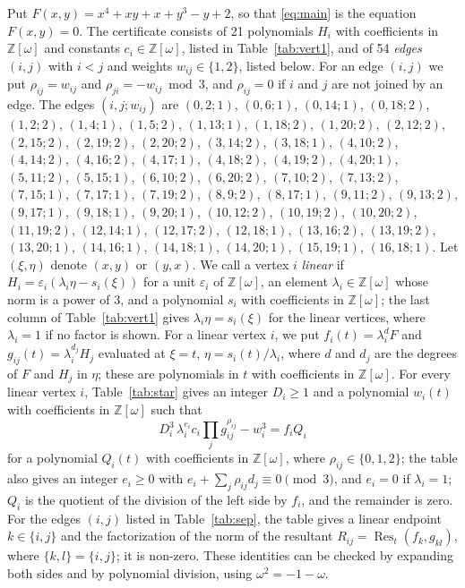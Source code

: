 \documentclass[11pt]{article}
\newcommand{\Z}{\mathbb{Z}}
\begin{document}
Put $F(x,y)=x^{4}+xy+x+y^{3}-y+2$, so that \eqref{eq:main} is the equation $F(x,y)=0$. The certificate consists of 21 polynomials $H_i$ with coefficients in $\Z[\omega]$ and constants $c_i\in\Z[\omega]$, listed in Table~\ref{tab:vert1}, and of 54 \emph{edges} $(i,j)$ with $i<j$ and weights $w_{ij}\in\{1,2\}$, listed below. For an edge $(i,j)$ we put $\rho_{ij}=w_{ij}$ and $\rho_{ji}=-w_{ij}\bmod 3$, and $\rho_{ij}=0$ if $i$ and $j$ are not joined by an edge.
The edges $(i,j;w_{ij})$ are $(0,2;1)$, $(0,6;1)$, $(0,14;1)$, $(0,18;2)$, $(1,2;2)$, $(1,4;1)$, $(1,5;2)$, $(1,13;1)$, $(1,18;2)$, $(1,20;2)$, $(2,12;2)$, $(2,15;2)$, $(2,19;2)$, $(2,20;2)$, $(3,14;2)$, $(3,18;1)$, $(4,10;2)$, $(4,14;2)$, $(4,16;2)$, $(4,17;1)$, $(4,18;2)$, $(4,19;2)$, $(4,20;1)$, $(5,11;2)$, $(5,15;1)$, $(6,10;2)$, $(6,20;2)$, $(7,10;2)$, $(7,13;2)$, $(7,15;1)$, $(7,17;1)$, $(7,19;2)$, $(8,9;2)$, $(8,17;1)$, $(9,11;2)$, $(9,13;2)$, $(9,17;1)$, $(9,18;1)$, $(9,20;1)$, $(10,12;2)$, $(10,19;2)$, $(10,20;2)$, $(11,19;2)$, $(12,14;1)$, $(12,17;2)$, $(12,18;1)$, $(13,16;2)$, $(13,19;2)$, $(13,20;1)$, $(14,16;1)$, $(14,18;1)$, $(14,20;1)$, $(15,19;1)$, $(16,18;1)$.
Let $(\xi,\eta)$ denote $(x,y)$ or $(y,x)$. We call a vertex $i$ \emph{linear} if $H_i=\varepsilon_i(\lambda_i\eta-s_i(\xi))$ for a unit $\varepsilon_i$ of $\Z[\omega]$, an element $\lambda_i\in\Z[\omega]$ whose norm is a power of $3$, and a polynomial $s_i$ with coefficients in $\Z[\omega]$; the last column of Table~\ref{tab:vert1} gives $\lambda_i\eta=s_i(\xi)$ for the linear vertices, where $\lambda_i=1$ if no factor is shown. For a linear vertex $i$, we put $f_i(t)=\lambda_i^{d}F$ and $g_{ij}(t)=\lambda_i^{d_j}H_j$ evaluated at $\xi=t$, $\eta=s_i(t)/\lambda_i$, where $d$ and $d_j$ are the degrees of $F$ and $H_j$ in $\eta$; these are polynomials in $t$ with coefficients in $\Z[\omega]$.
For every linear vertex $i$, Table~\ref{tab:star} gives an integer $D_i\geq1$ and a polynomial $w_i(t)$ with coefficients in $\Z[\omega]$ such that
\begin{equation}\label{eq:starlin}
D_i^3\,\lambda_i^{e_i}c_i\prod_jg_{ij}^{\rho_{ij}}-w_i^3=f_iQ_i
\end{equation}
for a polynomial $Q_i(t)$ with coefficients in $\Z[\omega]$, where $\rho_{ij}\in\{0,1,2\}$; the table also gives an integer $e_i\geq0$ with $e_i+\sum_j\rho_{ij}d_j\equiv0\pmod3$, and $e_i=0$ if $\lambda_i=1$; $Q_i$ is the quotient of the division of the left side by $f_i$, and the remainder is zero.
For the edges $(i,j)$ listed in Table~\ref{tab:sep}, the table gives a linear endpoint $k\in\{i,j\}$ and the factorization of the norm of the resultant $R_{ij}=\operatorname{Res}_t(f_k,g_{kl})$, where $\{k,l\}=\{i,j\}$; it is non-zero.
These identities can be checked by expanding both sides and by polynomial division, using $\omega^2=-1-\omega$.
\end{document}
